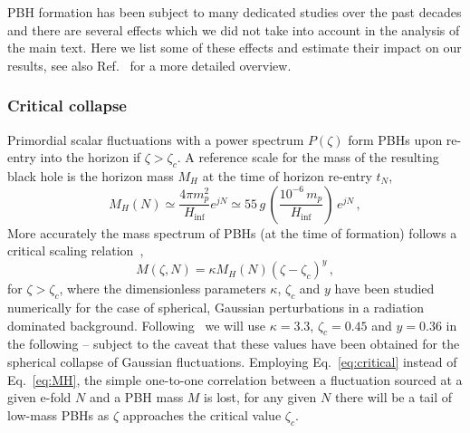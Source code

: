\label{app:PBH}
PBH formation has been subject to many dedicated studies over the past decades and there are several effects which we did not take into account in the analysis of the main text. Here we list some of these effects and estimate their impact on our results, see also Ref.~\cite{Carr:2016drx} for a more detailed overview.

\subsubsection*{Critical collapse}

Primordial scalar fluctuations with a power spectrum $P(\zeta)$ form PBHs upon re-entry into the horizon if  $\zeta > \zeta_c$. A reference scale for  the mass of the resulting black hole is the horizon mass $M_H$ at the time of horizon re-entry $t_N$,
\begin{equation}
M_H(N) 
 \simeq \frac{4 \pi m_p^2}{H_\text{inf}} e^{j N} \simeq 55 \, g \, \left( \frac{10^{-6} \, m_p}{H_\text{inf}}\right) \, e^{j N} \,,
 \label{eq:horizonmass}
\end{equation}
More accurately the mass spectrum of PBHs (at the time of formation) follows a critical scaling relation~\cite{Choptuik:1992jv,Koike:1995jm,Niemeyer:1999ak,Gundlach:1999cu,Gundlach:2002sx},
\begin{equation}
M(\zeta, N) = \kappa M_H(N) (\zeta - \zeta_c)^y \,,
\label{eq:critical}
\end{equation}
for $\zeta > \zeta_c$, where the dimensionless parameters $\kappa$, $\zeta_c$ and $y$ have been studied numerically for the case of spherical, Gaussian perturbations in a radiation dominated background. Following~\cite{Musco:2004ak,Musco:2008hv,Musco:2012au,Niemeyer:1997mt} we will use $\kappa = 3.3$, $\zeta_c = 0.45$ and $y = 0.36$ in the following -- subject to the caveat that these values have been obtained for the spherical collapse of Gaussian fluctuations. Employing Eq.~\eqref{eq:critical} instead of Eq.~\eqref{eq:MH}, the simple one-to-one correlation between a fluctuation sourced at a given e-fold $N$ and a PBH mass $M$ is lost, for any given $N$ there will be a tail of low-mass PBHs as $\zeta$ approaches the critical value $\zeta_c$.

